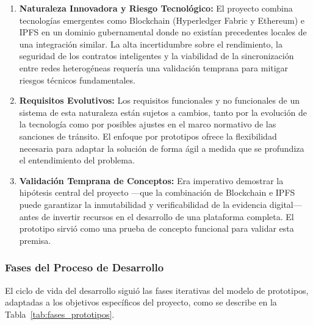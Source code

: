 \begin{enumerate}
    \item \textbf{Naturaleza Innovadora y Riesgo Tecnológico:} El proyecto combina tecnologías emergentes como Blockchain (Hyperledger Fabric y Ethereum) e IPFS en un dominio gubernamental donde no existían precedentes locales de una integración similar. La alta incertidumbre sobre el rendimiento, la seguridad de los contratos inteligentes y la viabilidad de la sincronización entre redes heterogéneas requería una validación temprana para mitigar riesgos técnicos fundamentales.
    
    \item \textbf{Requisitos Evolutivos:} Los requisitos funcionales y no funcionales de un sistema de esta naturaleza están sujetos a cambios, tanto por la evolución de la tecnología como por posibles ajustes en el marco normativo de las sanciones de tránsito. El enfoque por prototipos ofrece la flexibilidad necesaria para adaptar la solución de forma ágil a medida que se profundiza el entendimiento del problema.
    
    \item \textbf{Validación Temprana de Conceptos:} Era imperativo demostrar la hipótesis central del proyecto —que la combinación de Blockchain e IPFS puede garantizar la inmutabilidad y verificabilidad de la evidencia digital— antes de invertir recursos en el desarrollo de una plataforma completa. El prototipo sirvió como una prueba de concepto funcional para validar esta premisa.
\end{enumerate}

\subsubsection{Fases del Proceso de Desarrollo}

El ciclo de vida del desarrollo siguió las fases iterativas del modelo de prototipos, adaptadas a los objetivos específicos del proyecto, como se describe en la Tabla~\ref{tab:fases_prototipos}.

